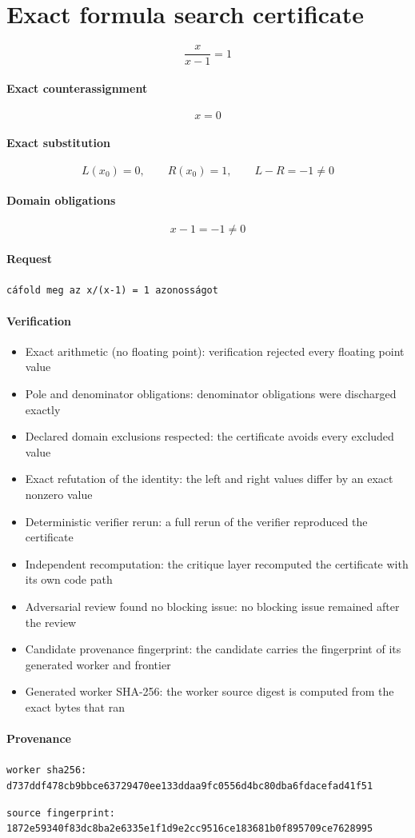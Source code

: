\documentclass{article}
\begin{document}
\section*{Exact formula search certificate}

\begin{equation}
  \frac{x}{x - 1} = 1
\end{equation}

\paragraph{Exact counterassignment}
\[
  x = 0
\]

\paragraph{Exact substitution}
\[
  L(x_0) = 0,\qquad R(x_0) = 1,\qquad L - R = -1 \neq 0
\]

\paragraph{Domain obligations}
\[
  x - 1 = -1 \neq 0
\]

\paragraph{Request}
\texttt{cáfold meg az x/(x-1) = 1 azonosságot}

\paragraph{Verification}
\begin{itemize}
  \item \checkmark Exact arithmetic (no floating point): verification rejected every floating point value
  \item \checkmark Pole and denominator obligations: denominator obligations were discharged exactly
  \item \checkmark Declared domain exclusions respected: the certificate avoids every excluded value
  \item \checkmark Exact refutation of the identity: the left and right values differ by an exact nonzero value
  \item \checkmark Deterministic verifier rerun: a full rerun of the verifier reproduced the certificate
  \item \checkmark Independent recomputation: the critique layer recomputed the certificate with its own code path
  \item \checkmark Adversarial review found no blocking issue: no blocking issue remained after the review
  \item \checkmark Candidate provenance fingerprint: the candidate carries the fingerprint of its generated worker and frontier
  \item \checkmark Generated worker SHA-256: the worker source digest is computed from the exact bytes that ran
\end{itemize}

\paragraph{Provenance}
\texttt{worker sha256: d737ddf478cb9bbce63729470ee133ddaa9fc0556d4bc80dba6fdacefad41f51}

\texttt{source fingerprint: 1872e59340f83dc8ba2e6335e1f1d9e2cc9516ce183681b0f895709ce7628995}
\end{document}
